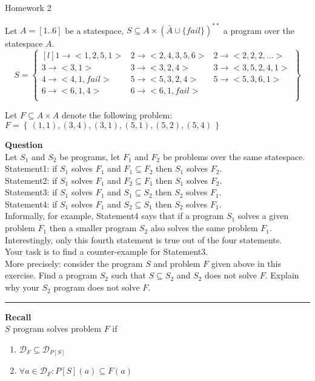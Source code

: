 \documentclass[12pt]{article}
\begin{document}
\author{Zsolt Borsi}

\begin{center}
{\Large Homework 2}
\end{center}
\bigskip

Let $A=\left[1..6\right]$ be a statespace, $S\subseteq A \times (\bar{A}\cup\{fail\})^{**}$ a program over the statespace $A$.
\[
S = \begin{Bmatrix*}[l]
1\rightarrow<1,2,5,1> & 2\rightarrow<2,4,3,5,6> & 2\rightarrow<2,2,2,\ldots>\\
3\rightarrow<3,1> & 3\rightarrow<3,2,4> & 3\rightarrow<3,5,2,4,1>\\
4\rightarrow<4,1,fail> & 5\rightarrow<5,3,2,4> & 5\rightarrow<5,3,6,1>\\
6\rightarrow<6,1,4> & 6\rightarrow<6,1,fail> & \\
\end{Bmatrix*}
\]

Let $F\subseteq A \times A$ denote the following problem: $F=\left\{\,(1,1),(3,4),(3,1),(5,1),(5,2),(5,4)\,\right\}$\\
\bigskip

\textbf{Question}\\ 
Let $S_1$ and $S_2$ be programs, let $F_1$ and $F_2$ be problems over the same statespace.\\
Statement1: if $S_1$ solves $F_1$ and $F_1 \subseteq F_2$ then $S_1$ solves $F_2$.\\
Statement2: if $S_1$ solves $F_1$ and $F_2 \subseteq F_1$ then $S_1$ solves $F_2$.\\
Statement3: if $S_1$ solves $F_1$ and $S_1 \subseteq S_2$ then $S_2$ solves $F_1$.\\
Statement4: if $S_1$ solves $F_1$ and $S_2 \subseteq S_1$ then $S_2$ solves $F_1$.\\

Informally, for example, Statement4 says that if a program $S_1$ solves a given problem $F_1$ then a smaller program $S_2$ also solves the same problem $F_1$. Interestingly, only this fourth statement is true out of the four statements.\\

Your task is to find a counter-example for Statement3.\\
More precisely: consider the program $S$ and problem $F$ given above in this exercise. Find a program $S_2$ such that $S \subseteq S_2$ and $S_2$ does not solve $F$. Explain why your $S_2$ program does not solve $F$.

\rule{\textwidth}{0.4pt}
\textbf{Recall}\\
$S$ program solves problem $F$ if
\begin{enumerate}
	\item $\mathcal{D}_F \subseteq \mathcal{D}_{P[S]}$
	\item $\forall a \in \mathcal{D}_F\colon P[S](a) \subseteq F(a)$
\end{enumerate}  		
\end{document}
